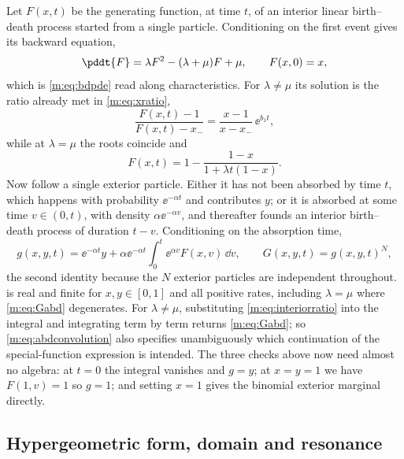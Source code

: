Let $F(x,t)$ be the generating function, at time $t$, of an interior linear
birth--death process started from a single particle. Conditioning on the first
event gives its backward equation,
\begin{equation}
\label{m:eq:interiorbackward}
\pddt{F} = \lambda F^2 - (\lambda+\mu)F + \mu,
\qquad F(x,0)=x ,
\end{equation}
which is \cref{m:eq:bdpde} read along characteristics. For $\lambda\neq\mu$ its
solution is the ratio already met in \cref{m:eq:xratio},
\begin{equation}
\label{m:eq:interiorratio}
\frac{F(x,t)-1}{F(x,t)-x_-} = \frac{x-1}{x-x_-}\,\ee^{b_1t},
\end{equation}
while at $\lambda=\mu$ the roots coincide and
\begin{equation}
\label{m:eq:interiorcritical}
F(x,t) = 1-\frac{1-x}{1+\lambda t(1-x)} .
\end{equation}
Now follow a single exterior particle. Either it has not been absorbed by time $t$,
which happens with probability $\ee^{-\alpha t}$ and contributes $y$; or it is
absorbed at some time $v\in(0,t)$, with density $\alpha\ee^{-\alpha v}$, and
thereafter founds an interior birth--death process of duration $t-v$. Conditioning
on the absorption time,
\begin{equation}
\label{m:eq:abdconvolution}
g(x,y,t) = \ee^{-\alpha t}y
+ \alpha\ee^{-\alpha t}\int_0^t\ee^{\alpha v}F(x,v)\,\dd v ,
\qquad
G(x,y,t) = g(x,y,t)^N ,
\end{equation}
the second identity because the $N$ exterior particles are independent throughout.
 is real and finite for $x,y\in[0,1]$ and all positive
rates, including $\lambda=\mu$ where \cref{m:eq:Gabd} degenerates. For
$\lambda\neq\mu$, substituting \cref{m:eq:interiorratio} into the integral and
integrating term by term returns \cref{m:eq:Gabd}; so \cref{m:eq:abdconvolution}
also specifies unambiguously which continuation of the special-function expression
is intended. The three checks above now need almost no algebra: at $t=0$ the
integral vanishes and $g=y$; at $x=y=1$ we have $F(1,v)=1$ so $g=1$; and setting
$x=1$ gives the binomial exterior marginal directly.

\subsection{Hypergeometric form, domain and resonance}
\label{m:app:abdhyp}

